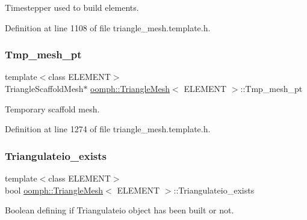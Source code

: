 Timestepper used to build elements. 



Definition at line 1108 of file triangle\+\_\+mesh.\+template.\+h.

\mbox{\label{classoomph_1_1TriangleMesh_a0c0fd18f3ec5d004370ba590d6c952d4}} 
\subsubsection{\texorpdfstring{Tmp\+\_\+mesh\+\_\+pt}{Tmp\_mesh\_pt}}
{\footnotesize\ttfamily template$<$class E\+L\+E\+M\+E\+NT$>$ \\
Triangle\+Scaffold\+Mesh$\ast$ \hyperlink{classoomph_1_1TriangleMesh}{oomph\+::\+Triangle\+Mesh}$<$ E\+L\+E\+M\+E\+NT $>$\+::Tmp\+\_\+mesh\+\_\+pt\hspace{0.3cm}{\ttfamily [protected]}}



Temporary scaffold mesh. 



Definition at line 1274 of file triangle\+\_\+mesh.\+template.\+h.

\mbox{\label{classoomph_1_1TriangleMesh_a6675edf7227a8ae62d7c13c8b406842b}} 
\subsubsection{\texorpdfstring{Triangulateio\+\_\+exists}{Triangulateio\_exists}}
{\footnotesize\ttfamily template$<$class E\+L\+E\+M\+E\+NT$>$ \\
bool \hyperlink{classoomph_1_1TriangleMesh}{oomph\+::\+Triangle\+Mesh}$<$ E\+L\+E\+M\+E\+NT $>$\+::Triangulateio\+\_\+exists\hspace{0.3cm}{\ttfamily [protected]}}



Boolean defining if Triangulateio object has been built or not. 



